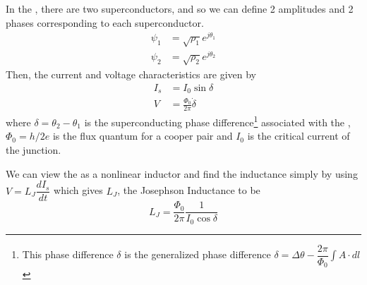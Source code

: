 In the \JJ, there are two superconductors, and so we can define 2 amplitudes and 2 phases corresponding to each superconductor.
\begin{align*}
\psi_1&=\sqrt{\rho_1}e^{j\theta_1}\\
\psi_2&=\sqrt{\rho_2}e^{j\theta_2}
\end{align*}
Then, the current and voltage characteristics are given by \cite{Harmans1997}
\begin{align}
I_s&=I_0\sin\delta
\label{eqn:JJ current}\\
V&=\frac{\Phi_0}{2\pi}\dot{\delta}
\label{eqn:JJ voltage}
\end{align}
where $\delta=\theta_2-\theta_1$ is the superconducting phase difference\footnote{This phase difference $\delta$ is the generalized phase difference $\delta=\Delta\theta-\displaystyle\dfrac{2\pi}{\Phi_0}\int A\cdot dl$} associated with the \JJ, $\Phi_0=h/2e$ is the flux quantum for a cooper pair and $I_0$ is the critical current of the junction.

We can view the \JJ as a nonlinear inductor and find the inductance simply by using $V=L_J\dfrac{dI_s}{dt}$ which gives $L_J$, the Josephson Inductance to be
\begin{equation}
L_J=\frac{\Phi_0}{2\pi}\frac{1}{I_0\cos\delta}
\end{equation}

